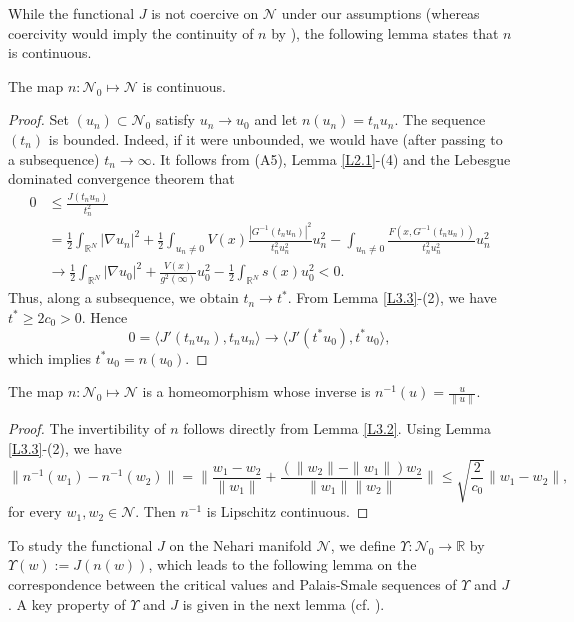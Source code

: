 \documentclass[reqno]{amsart}
\begin{document}
While the functional $J$ is not coercive on $\mathcal{N}$ under our assumptions 
(whereas coercivity would imply the continuity of $n$ by \cite[Lemma 2.8]{Szulkin1}), the following lemma states that $n$ is continuous.


\begin{lemma}\label{L3.8} 
The map $n:\mathcal{N}_0\mapsto \mathcal{N}$ is continuous.
\end{lemma}

\begin{proof}
Set $(u_n)\subset \mathcal{N}_0$  satisfy $u_n\to u_0$ and let $n(u_n)=t_nu_n$. 
The sequence $(t_n)$ is bounded. Indeed, if it were unbounded, we would have 
(after passing to a subsequence) $t_n \to \infty$. It follows from  (A5), 
Lemma \ref{L2.1}-(4) and the Lebesgue dominated convergence theorem that
\begin{align*}
0&\leq\frac{J(t_nu_n)}{t^2_n}\\
&= \frac{1}{2}\int_{\mathbb{R}^N}|\nabla u_n|^2+\frac{1}{2}\int_{u_n\neq 0}V(x)\frac{|G^{-1}(t_nu_n)|^2}{t^2_nu^2_n}u^2_n
-\int_{u_n\neq 0}\frac{F(x,G^{-1}(t_nu_n))}{t^2_nu^2_n}u^2_n \\
&\to  \frac{1}{2}\int_{\mathbb{R}^N}|\nabla u_0|^2+\frac{V(x)}{g^2(\infty)}u_0^2-\frac{1}{2}\int_{\mathbb{R}^N}s(x)u_0^2<0.
\end{align*}
Thus, along a subsequence, we obtain $t_n\to t^*$. From Lemma \ref{L3.3}-(2), we 
have $t^*\geq 2c_0>0$. Hence 
$$
0=\langle J'(t_nu_n),t_nu_n\rangle\to \langle J'(t^*u_0),t^*u_0\rangle,
$$  
which implies $t^*u_0=n(u_0)$.
\end{proof}

\begin{lemma}\label{L3.9} 
The map $n:\mathcal{N}_0\mapsto \mathcal{N}$ is a homeomorphism whose inverse  is  
$n^{-1}(u)=\frac{u}{\|u\|}$.
\end{lemma}

\begin{proof}
The invertibility of $n$  follows directly from Lemma \ref{L3.2}.
Using Lemma \ref{L3.3}-(2), we have 
$$
\|n^{-1}(w_1)-n^{-1}(w_2)\|=\|\frac{w_1-w_2}{\|w_1\|}+\frac{(\|w_2\|-\|w_1\|)w_2}{\|w_1\|\|w_2\|}\|\leq \sqrt{ \frac{2}{c_0}}\|w_1-w_2\|,
$$
for every $w_1, w_2\in\mathcal{N}$. Then $n^{-1}$ is Lipschitz continuous.
\end{proof}

To study the functional $J$ on the Nehari manifold $\mathcal{N}$, we define 
$\Upsilon: \mathcal{N}_0\to \mathbb{R}$ by $\Upsilon(w) := J(n(w))$, 
which leads to the following lemma on the correspondence between the critical values 
and Palais-Smale sequences of $\Upsilon$ and $J$. 
A key property of $\Upsilon$ and $J$ is given in the next lemma 
(cf. \cite[Lemma 3.9]{fang3}).
\end{document}
